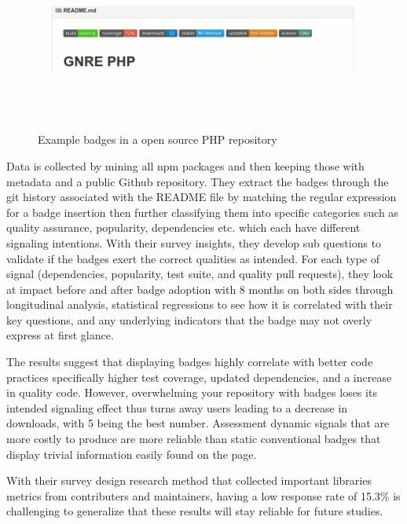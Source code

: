 \documentclass[12pt]{article}
\begin{document}
\begin{figure}
    \centering
    \includegraphics[width=\textwidth,height=6cm,keepaspectratio=true]{gnrephpbadges}
    \caption{
        Example badges in a open source PHP repository \protect\cite{badgeimage}
    }
    \label{phpbadge}
\end{figure}

Data is collected by mining all npm \cite{npm} packages and then keeping those with metadata and a public Github \cite{github} repository. 
They extract the badges through the git history associated with 
the README file by matching the regular expression for a badge insertion then further classifying them into specific categories
such as quality assurance, popularity, dependencies etc. which each have different signaling intentions.
With their survey insights, they develop sub questions to validate if the badges exert the correct qualities as intended. 
For each type of signal (dependencies, popularity, test suite, and quality pull requests), they look at 
impact before and after badge adoption with 8 months on both sides through longitudinal analysis, statistical regressions
to see how it is correlated with their key questions, and any underlying indicators that the badge may not overly express at first glance.

The results suggest that displaying badges highly correlate with better code practices specifically higher test coverage, updated dependencies, and a increase in quality code.
However, overwhelming your repository with badges loses its intended signaling effect thus turns away users leading to a decrease in downloads, with 5 being the best number.
Assessment dynamic signals that are more costly to produce are more reliable than static conventional badges that display trivial information easily found on the page.

With their survey design research method that collected important libraries metrics from contributers and maintainers, having a low response rate of 15.3\% 
is challenging to generalize that these results will stay reliable for future studies.
\end{document}
